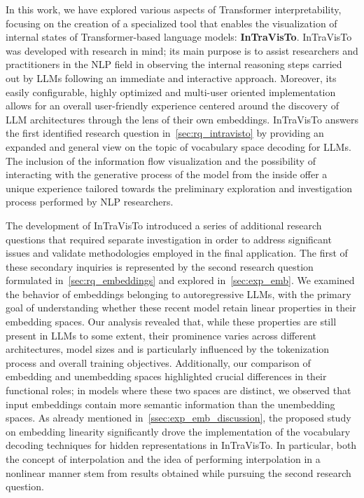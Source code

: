 In this work, we have explored various aspects of Transformer interpretability, focusing on the creation of a specialized tool that enables the visualization of internal states of Transformer-based language models: \textbf{InTraVisTo}.
InTraVisTo was developed with research in mind; its main purpose is to assist researchers and practitioners in the NLP field in observing the internal reasoning steps carried out by LLMs following an immediate and interactive approach.
Moreover, its easily configurable, highly optimized and multi-user oriented implementation allows for an overall user-friendly experience centered around the discovery of LLM architectures through the lens of their own embeddings.
InTraVisTo answers the first identified research question in~\cref{sec:rq_intravisto} by providing an expanded and general view on the topic of vocabulary space decoding for LLMs.
The inclusion of the information flow visualization and the possibility of interacting with the generative process of the model from the inside offer a unique experience tailored towards the preliminary exploration and investigation process performed by NLP researchers.

The development of InTraVisTo introduced a series of additional research questions that required separate investigation in order to address significant issues and validate methodologies employed in the final application.
The first of these secondary inquiries is represented by the second research question formulated in~\cref{sec:rq_embeddings} and explored in~\cref{sec:exp_emb}.
We examined the behavior of embeddings belonging to autoregressive LLMs, with the primary goal of understanding whether these recent model retain linear properties in their embedding spaces.
Our analysis revealed that, while these properties are still present in LLMs to some extent, their prominence varies across different architectures, model sizes and is particularly influenced by the tokenization process and overall training objectives.
Additionally, our comparison of embedding and unembedding spaces highlighted crucial differences in their functional roles; in models where these two spaces are distinct, we observed that input embeddings contain more semantic information than the unembedding spaces.
As already mentioned in~\cref{ssec:exp_emb_discussion}, the proposed study on embedding linearity significantly drove the implementation of the vocabulary decoding techniques for hidden representations in InTraVisTo.
In particular, both the concept of interpolation and the idea of performing interpolation in a nonlinear manner stem from results obtained while pursuing the second research question.

